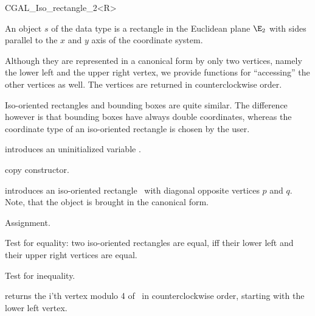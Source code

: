 
\begin {classtemplate} {CGAL_Iso_rectangle_2<R>}

  An object $s$ of the data type  is a
rectangle in the Euclidean plane $\E_2$ with sides parallel to the $x$ and
$y$ axis of the coordinate system.
 
Although they are represented in a canonical form by only two
vertices, namely the lower left and the upper right vertex, we provide
functions for ``accessing'' the other vertices as well. The vertices
are returned in counterclockwise order.

Iso-oriented rectangles and bounding boxes are quite similar. The
difference however is that bounding boxes have always double coordinates, 
whereas the coordinate type of an iso-oriented rectangle is chosen by
the user.


\creation
{}


\hidden {}
             {introduces an uninitialized variable \var.}

\hidden {}
 	    {copy constructor.}

            {introduces an iso-oriented rectangle \var\ with diagonal
             opposite vertices $p$ and $q$. Note, that the object is 
             brought in the canonical form.}


\operations
\threecolumns{5cm}{4cm}

\hidden {}
        {Assignment.}

       {Test for equality: two iso-oriented rectangles are equal, iff their
        lower left and their upper right vertices are equal.}

       {Test for inequality.}


       {returns the i'th vertex modulo 4  of \var\ in counterclockwise order, 
        starting with the lower left vertex.}


\end{classtemplate}
